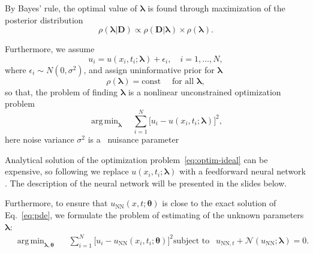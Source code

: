 \documentclass{beamer}
\def\\{}%
\newcommand{\Data}{\vec{D}}
\renewcommand{\vec}[1]{\boldsymbol{#1}}
\newcommand{\VTheta}{\ensuremath{\vec{\theta}}}
\newcommand{\VLambda}{\ensuremath{\vec{\lambda}}}
\DeclareMathOperator*{\argmin}{arg\,min}
\newcommand{\UNN}[1][\text{NN}]{u_{#1}}
\newcommand{\NonlinOp}{\mathcal N\!}
\begin{document}
\begin{frame}

By Bayes' rule, the optimal value of $\VLambda$ is found through
maximization of the posterior distribution \cite{sivia2006data}
\begin{equation*}
    \rho( \VLambda | \Data ) \propto
    \rho( \Data | \VLambda ) \times \rho( \VLambda ).
\end{equation*}

Furthermore, we assume
\begin{equation*}
    u_i = u(x_i, t_i; \VLambda) + \epsilon_i, \quad i=1, \dots, N,
\end{equation*}
where $\epsilon_i \sim N(0, \sigma^2)$, and assign uninformative prior for $\VLambda$
\begin{equation*}
    \rho(\vec{\lambda}) = \text{const} \quad \text{ for all } \vec{\lambda},
\end{equation*}
so that, the problem of finding $\VLambda$ is a nonlinear unconstrained
optimization problem
\begin{equation*}
    \label{eq:optim-ideal}
    \argmin_{\VLambda} \quad 
    \sum_{i=1}^{N} \big[ u_i - u(x_i, t_i; \VLambda) \big]^2,
\end{equation*}
here noise variance $\sigma^2$ is a~
nuisance parameter~\cite[section~8.2]{sivia2006data}
    
\end{frame}

\begin{frame}

Analytical solution of the optimization problem~\eqref{eq:optim-ideal} can be expensive, so following \cite{raissi2017pinnII}
we replace  $u(x_i, t_i; \VLambda)$ with a 
feedforward neural network \cite{goodfellow2016deep}. The description of the neural network will be presented in the slides below.

Furthermore, to ensure that $\UNN( x, t; \VTheta)$
is close to the exact solution of Eq.~\eqref{eq:pde}, we formulate the problem of estimating of the unknown parameters
$\VLambda$:
\begin{subequations}
\label{eq:optim}
\begin{align*}
    &\argmin_{\VLambda, \VTheta} \quad \ \ 
        \sum_{i=1}^N \big[u_i - \UNN(x_i, t_i; \VTheta)\big]^2  \\
    &\text{subject to } \ \ \UNN[\text{NN}, t]  + \NonlinOp(\UNN; \VLambda) = 0.
\end{align*}
\end{subequations}

\end{frame}
\end{document}
